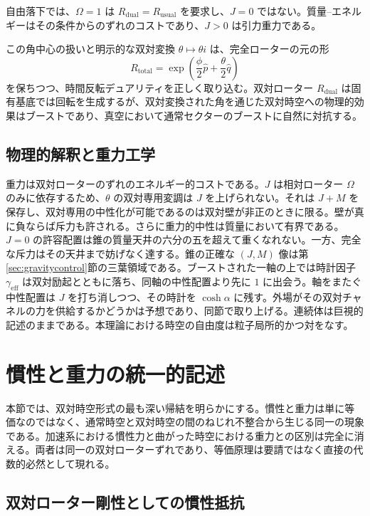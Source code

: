 \documentclass[a4paper]{article}
\begin{document}
自由落下では、$\Omega=1$ は $R_{\mathrm{dual}}=R_{\mathrm{usual}}$ を要求し、$J=0$ ではない。質量--エネルギーはその条件からのずれのコストであり、$J>0$ は引力重力である。

この角中心の扱いと明示的な双対変換 $\theta \mapsto \theta i$ は、完全ローターの元の形
\[
R_\text{total} = \exp\left( \frac{\phi}{2} \hat{p} + \frac{\theta}{2} \hat{q} \right)
\]
を保ちつつ、時間反転デュアリティを正しく取り込む。双対ローター $R_\text{dual}$ は固有基底では回転を生成するが、双対変換された角を通じた双対時空への物理的効果はブーストであり、真空において通常セクターのブーストに自然に対抗する。

\subsection{物理的解釈と重力工学}

重力は双対ローターのずれのエネルギー的コストである。$J$ は相対ローター $\Omega$ のみに依存するため、$\theta$ の双対専用変調は $J$ を上げられない。それは $J+M$ を保存し、双対専用の中性化が可能であるのは双対壁が非正のときに限る。壁が真に負ならば斥力も許される。さらに重力的中性は質量において有界である。$J=0$ の許容配置は錐の質量天井の六分の五を超えて重くなれない。一方、完全な斥力はその天井まで妨げなく達する。錐の正確な $(J,M)$ 像は第\ref{sec:gravitycontrol}節の三葉領域である。ブーストされた一軸の上では時計因子 $\gamma_{\mathrm{eff}}$ は双対励起とともに落ち、同軸の中性配置より先に $1$ に出会う。軸をまたぐ中性配置は $J$ を打ち消しつつ、その時計を $\cosh\alpha$ に残す。外場がその双対チャネルの力を供給するかどうかは予想であり、同節で取り上げる。連続体は巨視的記述のままである。本理論における時空の自由度は粒子局所的かつ対をなす。

\section{慣性と重力の統一的記述}
\label{sec:unified}

本節では、双対時空形式の最も深い帰結を明らかにする。慣性と重力は単に等価なのではなく、通常時空と双対時空の間のねじれ不整合から生じる同一の現象である。加速系における慣性力と曲がった時空における重力との区別は完全に消える。両者は同一の双対ローターずれであり、等価原理は要請ではなく直接の代数的必然として現れる。

\subsection{双対ローター剛性としての慣性抵抗}
\end{document}
